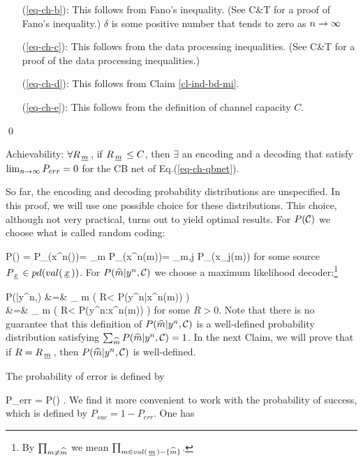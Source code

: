 \documentclass[12pt]{article}
\begin{document}
\begin{itemize}
\item[(\ref{eq-ch-b}):]
This follows from Fano's inequality.
(See C\&T for a proof
of Fano's inequality.)
$\delta$ is some positive number
that tends to zero as $n\rightarrow \infty$

\item[(\ref{eq-ch-c}):] This follows from the data processing
inequalities. (See C\&T for a
proof of the data processing inequalities.)

\item[(\ref{eq-ch-d}):] This
follows from Claim \ref{cl-ind-bd-mi}.


\item[(\ref{eq-ch-e}):] This follows from the definition of
channel capacity $C$.
\end{itemize}
\mbox{\;}
\qed

\begin{claim}
Achievability:
$\forall R_{\,\underline{m}\,}$,
if $R_{\,\underline{m}\,}\leq C$, then
$\exists$
an encoding and a decoding
that satisfy $\lim_{n\rightarrow\infty}P_{err}=0$
for the CB net of
Eq.(\ref{eq-ch-qbnet}).
\end{claim}
\proof
So far, the
encoding and decoding probability
distributions are unspecified.
In this proof, we will use one
possible choice
for these distributions. This choice,
although not very practical,
turns out to yield optimal results.
For $P({ \cal C })$ we choose what is
called random coding:

\beq
P(\calc) = P_\rvx(x^n(\cdot))=
\prod_{m}
P_\rvx(x^n(m))=
\prod_{m,j}
P_\rvx(x_j(m))
\;
\eeq
for some source $P_{\,\underline{x}\,}
\in pd(val({\,\underline{x}\,}))$.
For
$P({\widehat{m}}|y^n,{ \cal C })$
we choose a maximum likelihood
decoder:\footnote{By
$\prod_{ m\neq {\widehat{m}}}$
we mean $\prod_{ m\in val({\,\underline{m}\,})-\{{\widehat{m}}\}}$.
}

\beqa
P(|y^n,\calc)
&=&
\prod_{ m\neq {}}
\theta\left(
R< \ln
{}
{P(y^n|x^n(m))}
\right)
\\
&=&
\prod_{ m\neq {}}
\theta\left(
R< \ln
{}
{P(y^n:x^n(m))}
\right)\;
\eeqa
for some $R>0$.
Note that there is no
guarantee that
this definition of $P({\widehat{m}}|y^n,{ \cal C })$
is a well-defined probability distribution
satisfying
$\sum_{{\widehat{m}}}P({\widehat{m}}|y^n,{ \cal C })=1$.
In the next Claim, we
will prove
that if $R=R_{\,\underline{m}\,}$,
then $P({\widehat{m}}|y^n,{ \cal C })$
is well-defined.

The probability
of error is defined by

\beq
P_{err} =
P(\what{\rvm}\neq \rvm)
\;.
\eeq
We find it more convenient to work
with the probability of success,
which is defined by $P_{suc} =1-P_{err}$.
One has
\end{document}

